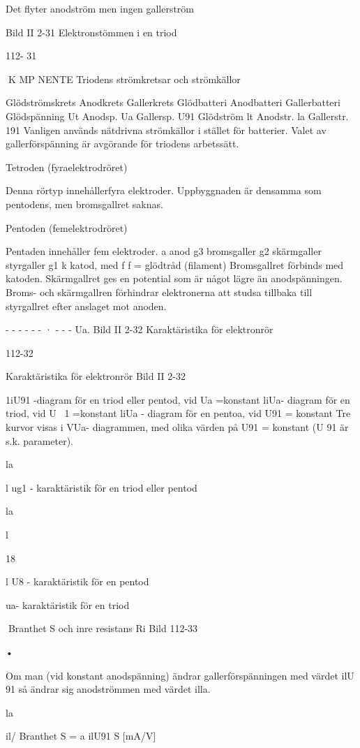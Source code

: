 Det flyter anodström men ingen gallerström

Bild II 2-31 Elektronstömmen i en triod

112- 31

K MP NENTE
Triodens strömkretsar och strömkällor

Glödströmskrets Anodkrets Gallerkrets
Glödbatteri
Anodbatteri Gallerbatteri
Glödspänning Ut Anodsp. Ua Gallersp. U91
Glödström lt
Anodstr. la Gallerstr. 191
Vanligen används nätdrivna strömkällor i
stället för batterier.
Valet av gallerförspänning är avgörande för
triodens arbetssätt.

Tetroden (fyraelektrodröret)

Denna rörtyp innehållerfyra elektroder. Uppbyggnaden är densamma som pentodens,
men bromsgallret saknas.

Pentoden (femelektrodröret)

Pentaden innehåller fem elektroder.
a
anod
g3
bromsgaller
g2
skärmgaller
styrgaller
g1
k
katod, med f f = glödtråd (filament)
Bromsgallret förbinds med katoden. Skärmgallret ges en potential som är något lägre än
anodspänningen. Broms- och skärmgallren
förhindrar elektronerna att studsa tillbaka till
styrgallret efter anslaget mot anoden.

- - - - - - · - - - Ua.
Bild II 2-32 Karaktäristika för elektronrör

112-32

Karaktäristika för elektronrör
Bild II 2-32

1iU91 -diagram för en triod eller pentod, vid Ua
=konstant
liUa- diagram för en triod, vid U~ 1 =konstant
liUa - diagram för en pentoa, vid U91 =
konstant
Tre kurvor visas i VUa- diagrammen, med
olika värden på U91 = konstant (U 91 är s.k.
parameter).

la

l ug1 - karaktäristik för en triod eller pentod

la

l

18

l U8 - karaktäristik för en pentod

ua- karaktäristik för en triod

Branthet S och inre resistans Ri
Bild 112-33

•

Om man (vid konstant anodspänning)
ändrar gallerförspänningen med värdet
ilU 91 så ändrar sig anodströmmen med
värdet illa.

la

il/
Branthet S = a
ilU91
S [mA/V]

